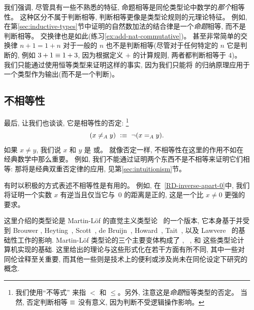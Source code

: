 \begin{rmk}\label{rmk:propeq-vs-jdeq}
我们强调, 尽管具有一些不熟悉的特征, 命题相等是同伦类型论中数学的\emph{那个}相等性。
这种区分不属于判断相等, 判断相等更像是类型论规则的元理论特征。
例如, 在第\ref{sec:inductive-types}节中证明的自然数加法的结合律是一个\emph{命题}相等, 而不是判断相等。
交换律也是如此(练习\ref{ex:add-nat-commutative})。
甚至非常简单的交换律 $n+1=1+n$ 对于一般的 $n$ 也不是判断相等(尽管对于任何特定的 $n$ 它是判断的, 例如 $3+1\jdeq 1+3$, 因为根据定义 $+$ 的计算规则, 两者都判断相等于 $4$)。
我们只能通过使用恒等类型来证明这样的事实, 因为我们只能将 \nat 的归纳原理应用于一个类型作为输出(而不是一个判断)。
\end{rmk}

\subsection{不相等性}
\label{sec:disequality}

最后, 让我们也谈谈,
%
它是相等性的否定:%
\footnote{我们使用``不等式''
来指 $<$ 和 $\leq$。另外, 注意这是\emph{命题}恒等类型的否定。
当然, 否定判断相等 $\jdeq$ 没有意义, 因为判断不受逻辑操作影响。}
%
\begin{equation*}
  (x \neq_A y) \ \defeq\ \lnot (\id[A]{x}{y}).
\end{equation*}
如果 $x\neq y$, 我们说 $x$ 和 $y$ 是
%
或。
%
就像否定一样, 不相等性在这里的作用不如在经典数学中那么重要。
例如, 我们不能通过证明两个东西不是不相等来证明它们相等: 那将是经典双重否定律的应用, 见第\ref{sec:intuitionism}节。

有时以积极的方式表述不相等性是有用的。
例如, 在~\cref{RD-inverse-apart-0}中, 我们将证明一个实数 $x$ 有逆当且仅当它与~$0$ 的距离是正的, 这是一个比 $x
\neq 0$ 更强的要求。

%

\sectionNotes

这里介绍的类型论是 Martin-L\"{o}f 的直觉主义类型论~\cite{Martin-Lof-1972,Martin-Lof-1973,Martin-Lof-1979,martin-lof:bibliopolis} 的一个版本, 
它本身基于并受到 Brouwer \cite{beeson}, Heyting~\cite{heyting1966intuitionism}, Scott~\cite{scott70}, de Bruijn~\cite{deBruijn-1973}, Howard~\cite{howard:pat}, Tait~\cite{Tait-1966,Tait-1968}, 
以及 Lawvere~\cite{lawvere:adjinfound} 的基础性工作的影响.
%
Martin-L\"{o}f 类型论的三个主要变体构成了 \NuPRL \cite{constable+86nuprl-book}, \Coq~\cite{Coq}, 和 \Agda \cite{norell2007towards} 这些类型论计算机实现的基础. 
这里给出的理论与这些形式化在若干方面有所不同, 其中一些对同伦诠释至关重要, 而其他一些则是技术上的便利或涉及尚未在同伦设定下研究的概念.

